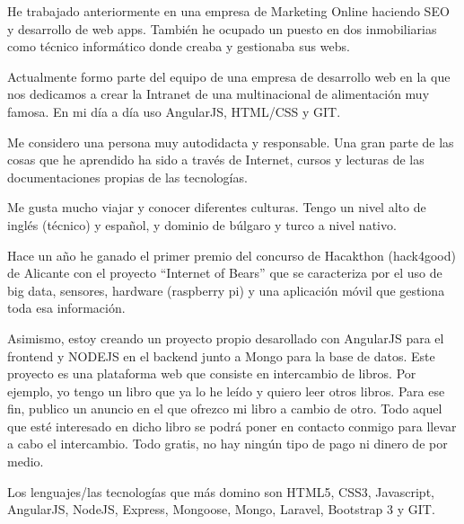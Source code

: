 

\begin{cvparagraph}

He trabajado anteriormente en una empresa de Marketing Online haciendo SEO y desarrollo de web apps. También he ocupado un puesto en dos inmobiliarias como técnico informático donde creaba y gestionaba sus webs.
 
Actualmente formo parte del equipo de una empresa de desarrollo web en la que nos dedicamos a crear la Intranet de una multinacional de alimentación muy famosa. En mi día a día uso AngularJS, HTML/CSS y GIT.
 
Me considero una persona muy autodidacta y responsable. Una gran parte de las cosas que he aprendido ha sido a través de Internet, cursos y lecturas de las documentaciones propias de las tecnologías.
 
Me gusta mucho viajar y conocer diferentes culturas. Tengo un nivel alto de inglés (técnico) y español, y dominio de búlgaro y turco a nivel nativo.
 
Hace un año he ganado el primer premio del concurso de Hacakthon (hack4good) de Alicante con el proyecto “Internet of Bears” que se caracteriza por el uso de big data, sensores, hardware (raspberry pi) y una aplicación móvil que gestiona toda esa información.
                                                               
Asimismo, estoy creando un proyecto propio desarollado con AngularJS para el frontend y NODEJS en el backend junto a Mongo para la base de datos. Este proyecto es una plataforma web que consiste en intercambio de libros. Por ejemplo, yo tengo un libro que ya lo he leído y quiero leer otros libros. Para ese fin, publico un anuncio en el que ofrezco mi libro a cambio de otro. Todo aquel que esté interesado en dicho libro se podrá poner en contacto conmigo para llevar a cabo el intercambio. Todo gratis, no hay ningún tipo de pago ni dinero de por medio.
 
Los lenguajes/las tecnologías que más domino son HTML5, CSS3, Javascript, AngularJS, NodeJS, Express, Mongoose, Mongo, Laravel, Bootstrap 3 y GIT.
\end{cvparagraph}
